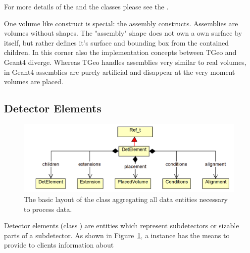 \documentclass[10pt,a4paper]{article}
\begin{document}
\noindent
For more details of the  and the  classes please see the 
.

\noindent
One volume like construct is special: the assembly constructs.
Assemblies are volumes without shapes. The "assembly" shape does not
own a own surface by itself, but rather defines it's surface and 
bounding box from the contained children.
In this corner also the implementation concepts between TGeo and Geant4 diverge.
Whereas TGeo handles assemblies very similar to real volumes, in Geant4 
assemblies are purely artificial and disappear at the very moment volumes 
are placed.

\newpage
\subsection{Detector Elements}
\label{sec:dd4hep-user-manual-detector-elements}
\begin{figure}[b]
  \begin{center}
    \includegraphics[width=160mm] {DD4hep-detelement-drawing}
    \caption{The basic layout of the  class aggregating
        all data entities necessary to process data.}
    \label{fig:dd4hep-user-manual-detelement-drawing}
  \end{center}
  \vspace{-0.6cm}
\end{figure}

\noindent
Detector elements (class ) are entities which represent 
subdetectors or sizable parts of a subdetector.
As shown in Figure~\ref{fig:dd4hep-user-manual-detelement-drawing},
a  instance has the means to provide to clients information about
\end{document}
